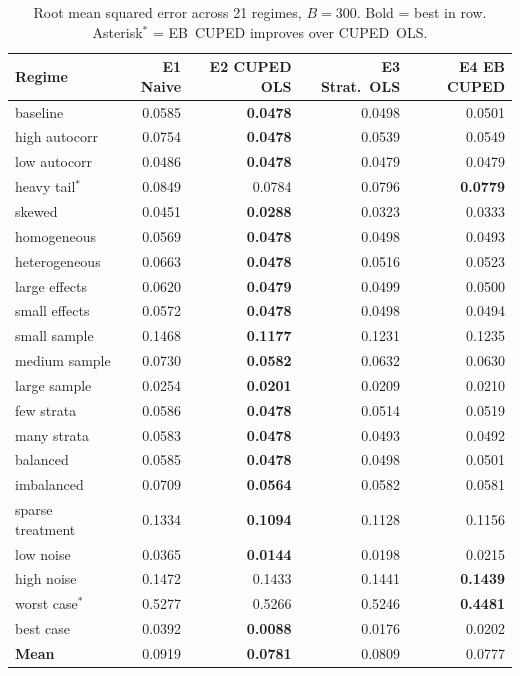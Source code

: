 \documentclass[11pt,letterpaper]{article}
\begin{document}
\begin{table}[htbp]
\centering
\caption{Root mean squared error across 21 regimes, $B=300$.
Bold = best in row.  Asterisk$^{*}$ = EB~CUPED improves over CUPED~OLS.}
\label{tab:rmse}
\small
\begin{tabular}{@{}l rrrr@{}}
\toprule
Regime & E1 Naive & E2 CUPED OLS & E3 Strat.\ OLS & E4 EB CUPED \\
\midrule
baseline            & 0.0585 & \textbf{0.0478} & 0.0498 & 0.0501 \\
high autocorr       & 0.0754 & \textbf{0.0478} & 0.0539 & 0.0549 \\
low autocorr        & 0.0486 & \textbf{0.0478} & 0.0479 & 0.0479 \\
\midrule
heavy tail$^{*}$    & 0.0849 & 0.0784 & 0.0796 & \textbf{0.0779} \\
skewed              & 0.0451 & \textbf{0.0288} & 0.0323 & 0.0333 \\
\midrule
homogeneous         & 0.0569 & \textbf{0.0478} & 0.0498 & 0.0493 \\
heterogeneous       & 0.0663 & \textbf{0.0478} & 0.0516 & 0.0523 \\
large effects       & 0.0620 & \textbf{0.0479} & 0.0499 & 0.0500 \\
small effects       & 0.0572 & \textbf{0.0478} & 0.0498 & 0.0494 \\
\midrule
small sample        & 0.1468 & \textbf{0.1177} & 0.1231 & 0.1235 \\
medium sample       & 0.0730 & \textbf{0.0582} & 0.0632 & 0.0630 \\
large sample        & 0.0254 & \textbf{0.0201} & 0.0209 & 0.0210 \\
\midrule
few strata          & 0.0586 & \textbf{0.0478} & 0.0514 & 0.0519 \\
many strata         & 0.0583 & \textbf{0.0478} & 0.0493 & 0.0492 \\
\midrule
balanced            & 0.0585 & \textbf{0.0478} & 0.0498 & 0.0501 \\
imbalanced          & 0.0709 & \textbf{0.0564} & 0.0582 & 0.0581 \\
sparse treatment    & 0.1334 & \textbf{0.1094} & 0.1128 & 0.1156 \\
\midrule
low noise           & 0.0365 & \textbf{0.0144} & 0.0198 & 0.0215 \\
high noise          & 0.1472 & 0.1433 & 0.1441 & \textbf{0.1439} \\
\midrule
worst case$^{*}$    & 0.5277 & 0.5266 & 0.5246 & \textbf{0.4481} \\
best case           & 0.0392 & \textbf{0.0088} & 0.0176 & 0.0202 \\
\midrule
\textbf{Mean}       & 0.0919 & \textbf{0.0781} & 0.0809 & 0.0777 \\
\bottomrule
\end{tabular}
\end{table}
\end{document}
